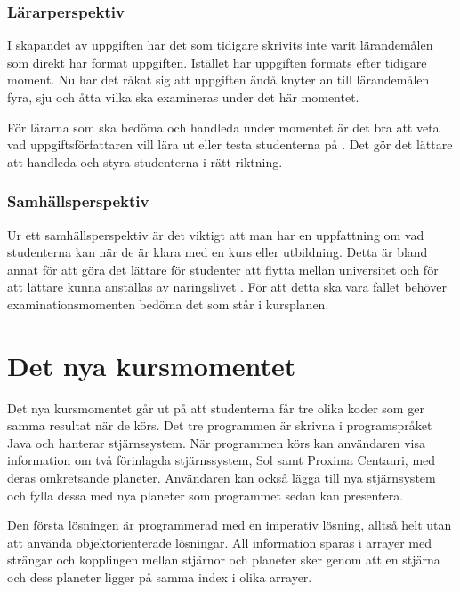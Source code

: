 \documentclass[a4paper, 10pt]{article}
\begin{document}
\subsubsection{Lärarperspektiv}

I skapandet av uppgiften har det som tidigare 
skrivits inte varit lärandemålen som direkt har 
format uppgiften. Istället har uppgiften formats 
efter tidigare moment. Nu har det råkat sig att 
uppgiften ändå knyter an till lärandemålen fyra,
sju och åtta vilka ska examineras under det här 
momentet.

För lärarna som ska bedöma och handleda under 
momentet är det bra att veta vad 
uppgiftsförfattaren vill lära ut eller testa 
studenterna på \parencite[sida 142]{branden2022}.
Det gör det lättare att handleda och styra 
studenterna i rätt riktning.

\subsubsection{Samhällsperspektiv}

Ur ett samhällsperspektiv är det viktigt att 
man har en uppfattning om vad studenterna kan 
när de är klara med en kurs eller utbildning.
Detta är bland annat för att göra det lättare 
för studenter att flytta mellan universitet 
och för att lättare kunna anställas av 
näringslivet \parencite{uhrbologna}. För att 
detta ska vara fallet behöver 
examinationsmomenten bedöma det som står i 
kursplanen.

\section{Det nya kursmomentet}

Det nya kursmomentet går ut på att 
studenterna får tre olika koder som ger 
samma resultat när de körs. Det tre 
programmen är skrivna i programspråket 
Java och hanterar stjärnssystem. När 
programmen körs kan användaren visa 
information om två förinlagda stjärnssystem,
Sol samt Proxima Centauri, med deras 
omkretsande planeter. Användaren kan 
också lägga till nya stjärnsystem och 
fylla dessa med nya planeter som 
programmet sedan kan presentera.


Den första lösningen är programmerad med 
en imperativ lösning, alltså helt utan att 
använda objektorienterade lösningar. All 
information sparas i arrayer med strängar 
och kopplingen mellan stjärnor och planeter 
sker genom att en stjärna och dess planeter 
ligger på samma index i olika arrayer.
\end{document}
